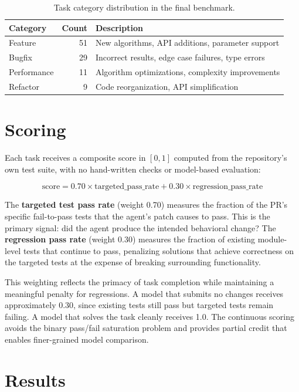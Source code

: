 \documentclass[10pt]{article}
\begin{document}
\begin{table}[ht]
\centering
\begin{tabular}{lrl}
\toprule
\textbf{Category} & \textbf{Count} & \textbf{Description} \\
\midrule
Feature & 51 & New algorithms, API additions, parameter support \\
Bugfix & 29 & Incorrect results, edge case failures, type errors \\
Performance & 11 & Algorithm optimizations, complexity improvements \\
Refactor & 9 & Code reorganization, API simplification \\
\bottomrule
\end{tabular}
\caption{Task category distribution in the final benchmark.}
\label{tab:categories}
\end{table}

\section{Scoring}

Each task receives a composite score in $[0, 1]$ computed from the repository's own test suite, with no hand-written checks or model-based evaluation:

\begin{equation}
    \text{score} = 0.70 \times \text{targeted\_pass\_rate} + 0.30 \times \text{regression\_pass\_rate}
\end{equation}

The \textbf{targeted test pass rate} (weight 0.70) measures the fraction of the PR's specific fail-to-pass tests that the agent's patch causes to pass. This is the primary signal: did the agent produce the intended behavioral change? The \textbf{regression pass rate} (weight 0.30) measures the fraction of existing module-level tests that continue to pass, penalizing solutions that achieve correctness on the targeted tests at the expense of breaking surrounding functionality.

This weighting reflects the primacy of task completion while maintaining a meaningful penalty for regressions. A model that submits no changes receives approximately 0.30, since existing tests still pass but targeted tests remain failing. A model that solves the task cleanly receives 1.0. The continuous scoring avoids the binary pass/fail saturation problem and provides partial credit that enables finer-grained model comparison.

\section{Results}
\end{document}
